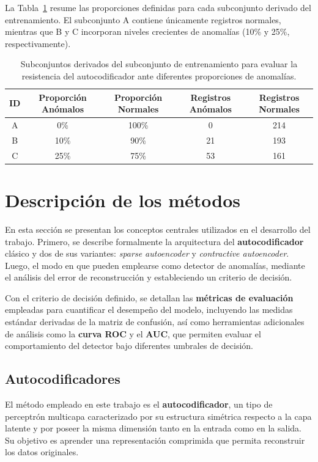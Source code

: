 \documentclass[a4paper,10pt]{book}
\begin{document}
La Tabla~\ref{tab:proporciones_conjunto} resume las proporciones definidas para cada subconjunto derivado del entrenamiento. El subconjunto A contiene únicamente registros normales, mientras que B y C incorporan niveles crecientes de anomalías (10\% y 25\%, respectivamente).
\begin{table}[H]
	\centering
	\begin{tabular}{ccccc}
		\toprule
		\textbf{ID} & \textbf{Proporción Anómalos} & \textbf{Proporción Normales} & \textbf{Registros Anómalos} & \textbf{Registros Normales} \\
		\midrule
		A & 0\%  & 100\% & 0  & 214 \\
		B & 10\% & 90\%  & 21 & 193 \\
		C & 25\% & 75\%  & 53 & 161 \\
		\bottomrule
	\end{tabular}
	\caption{Subconjuntos derivados del subconjunto de entrenamiento para evaluar la resistencia del autocodificador ante diferentes proporciones de anomalías.}
	\label{tab:proporciones_conjunto}
\end{table}

\section{Descripción de los métodos}

En esta sección se presentan los conceptos centrales utilizados en el desarrollo del trabajo. Primero, se describe formalmente la arquitectura del \textbf{autocodificador} clásico y dos de sus variantes: \emph{sparse autoencoder} y \emph{contractive autoencoder}. Luego, el modo en que pueden emplearse como detector de anomalías, mediante el análisis del error de reconstrucción y estableciendo un criterio de decisión.

Con el criterio de decisión definido, se detallan las \textbf{métricas de evaluación} empleadas para cuantificar el desempeño del modelo, incluyendo las medidas estándar derivadas de la matriz de confusión, así como herramientas adicionales de análisis como la \textbf{curva ROC} y el \textbf{AUC}, que permiten evaluar el comportamiento del detector bajo diferentes umbrales de decisión.

\subsection{Autocodificadores}

El método empleado en este trabajo es el \textbf{autocodificador}, un tipo de perceptrón multicapa caracterizado por su estructura simétrica respecto a la capa latente y por poseer la misma dimensión tanto en la entrada como en la salida. Su objetivo es aprender una representación comprimida que permita reconstruir los datos originales.\\
\end{document}
